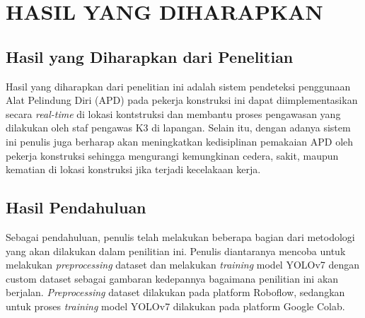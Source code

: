 \chapter{HASIL YANG DIHARAPKAN}

\section{Hasil yang Diharapkan dari Penelitian}

\par Hasil yang diharapkan dari penelitian ini adalah sistem pendeteksi penggunaan Alat Pelindung Diri (APD) pada pekerja konstruksi ini dapat diimplementasikan secara \emph{real-time} di lokasi kontstruksi dan membantu proses pengawasan yang dilakukan oleh staf pengawas K3 di lapangan. Selain itu, dengan adanya sistem ini penulis juga berharap akan meningkatkan kedisiplinan pemakaian APD oleh pekerja konstruksi sehingga mengurangi kemungkinan cedera, sakit, maupun kematian di lokasi konstruksi jika terjadi kecelakaan kerja.

\section{Hasil Pendahuluan}

Sebagai pendahuluan, penulis telah melakukan beberapa bagian dari metodologi yang akan dilakukan dalam penilitian ini. Penulis diantaranya mencoba untuk melakukan \emph{preprocessing} dataset dan melakukan \emph{training} model YOLOv7 dengan custom dataset sebagai gambaran kedepannya bagaimana penilitian ini akan berjalan. \emph{Preprocessing} dataset dilakukan pada platform Roboflow, sedangkan untuk proses \emph{training} model YOLOv7 dilakukan pada platform Google Colab.